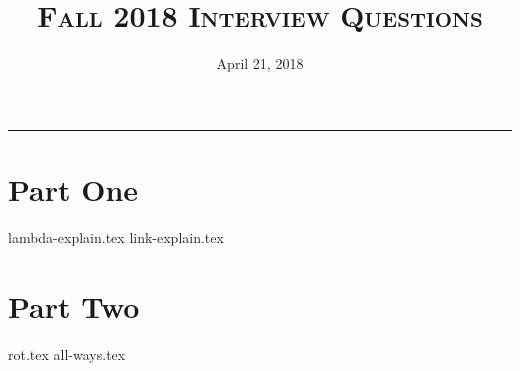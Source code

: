 \documentclass{exam}
\title{\textsc{Fall 2018 Interview Questions}}
\date{April 21, 2018}
\begin{document}
\maketitle
\rule{\textwidth}{0.15em}
\fontsize{12}{15}\selectfont

\begin{questions}
\section{Part One}
{lambda-explain.tex}
\newpage
{link-explain.tex}
\newpage
\section{Part Two}
{rot.tex}
\newpage
{all-ways.tex}
\end{questions}
\end{document}
